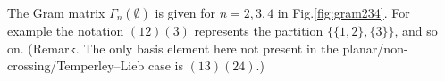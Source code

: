 \documentclass[reqno,10pt,a4paper]{amsart}
\newcommand{\red}[1]{\textcolor{red}{#1}}
\newcommand{\ppm}[1]{\red{#1}}
\newcommand{\ignore}[1]{}
\newcommand{\Gram}{\Gamma}
\begin{document}
\begin{eg} \label{eg:gramSn0}
\ignore{ 
Consider the  %
Gram matrix 
$\Gram_n(\emptyset)$
of the $P^{}_n(\delta)$ %
module  $\mathcal{S}_n(\emptyset)$ 
in the  {standard-basis (as in (\ref{de:PnE0basis}))}.
}
The Gram matrix $\Gram_n(\emptyset)$
is 
given 
for $n=2,3,4$
in Fig.\ref{fig:gram234}.
For example the notation $(12)(3)$ represents the
partition $\{\{1,2\},\{3\}\}$, and so on. 
(Remark. The only basis element here not present in the
planar/non-crossing/Temperley--Lieb case is $(13)(24)$.) 

\end{eg}
\end{document}
